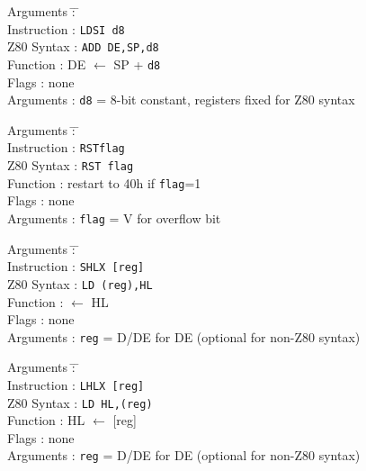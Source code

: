 \documentclass[12pt,twoside]{report}
\newcommand{\tty}[1]{{\tt #1}}
\begin{document}
\begin{tabbing}
Arguments         \= : \= \kill \\
Instruction       \> : \> \tty{LDSI d8} \\
Z80 Syntax        \> : \> \tty{ADD DE,SP,d8} \\
Function          \> : \> DE $\leftarrow$ SP + {\tt d8} \\
Flags             \> : \> none \\
Arguments         \> : \> {\tt d8} = 8-bit constant, registers fixed for Z80 syntax \\
\end{tabbing}

\begin{tabbing}
Arguments         \= : \= \kill \\
Instruction       \> : \> \tty{RSTflag} \\
Z80 Syntax        \> : \> \tty{RST flag} \\
Function          \> : \> restart to 40h if {\tt flag}=1 \\
Flags             \> : \> none \\
Arguments         \> : \> {\tt flag} = V for overflow bit \\
\end{tabbing}

\begin{tabbing}
Arguments         \= : \= \kill \\
Instruction       \> : \> \tty{SHLX [reg]} \\
Z80 Syntax        \> : \> \tty{LD (reg),HL} \\
Function          \> : \> [reg] $\leftarrow$ HL \\
Flags             \> : \> none \\
Arguments         \> : \> \tty{reg} = D/DE for DE (optional for non-Z80 syntax) \\
\end{tabbing}

\begin{tabbing}
Arguments         \= : \= \kill \\
Instruction       \> : \> \tty{LHLX [reg]} \\
Z80 Syntax        \> : \> \tty{LD HL,(reg)} \\
Function          \> : \> HL $\leftarrow$ [reg] \\
Flags             \> : \> none \\
Arguments         \> : \> \tty{reg} = D/DE for DE (optional for non-Z80 syntax) \\
\end{tabbing}
\end{document}
